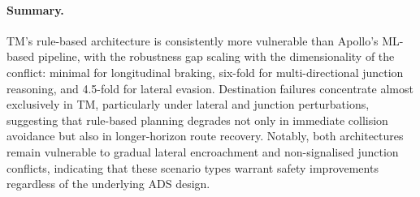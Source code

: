 \paragraph{Summary.}
TM's rule-based architecture is consistently more vulnerable than Apollo's ML-based pipeline, with the robustness gap scaling with the dimensionality of the conflict: minimal for longitudinal braking, six-fold for multi-directional junction reasoning, and 4.5-fold for lateral evasion. Destination failures concentrate almost exclusively in TM, particularly under lateral and junction perturbations, suggesting that rule-based planning degrades not only in immediate collision avoidance but also in longer-horizon route recovery. Notably, both architectures remain vulnerable to gradual lateral encroachment and non-signalised junction conflicts, indicating that these scenario types warrant safety improvements regardless of the underlying ADS design.




